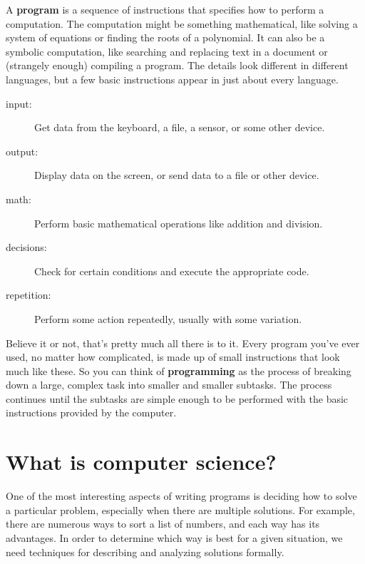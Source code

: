 \documentclass[12pt]{book}
\theoremstyle{exercise}
\begin{document}

A {\bf program} is a sequence of instructions that specifies how to perform a computation.
The computation might be something mathematical, like solving a system of equations or finding the roots of a polynomial.
It can also be a symbolic computation, like searching and replacing text in a document or (strangely enough) compiling a program.
The details look different in different languages, but a few basic instructions appear in just about every language.

\begin{description}
\item[input:] Get data from the keyboard, a file, a sensor, or some other device.
\item[output:] Display data on the screen, or send data to a file or other device.
\item[math:] Perform basic mathematical operations like addition and division.
\item[decisions:] Check for certain conditions and execute the appropriate code.
\item[repetition:] Perform some action repeatedly, usually with some variation.
\end{description}


Believe it or not, that's pretty much all there is to it.
Every program you've ever used, no matter how complicated, is made up of small instructions that look much like these.
So you can think of {\bf programming} as the process of breaking down a large, complex task into smaller and smaller subtasks.
The process continues until the subtasks are simple enough to be performed with the basic instructions provided by the computer.


\section{What is computer science?}

One of the most interesting aspects of writing programs is deciding how to solve a particular problem, especially when there are multiple solutions.
For example, there are numerous ways to sort a list of numbers, and each way has its advantages.
In order to determine which way is best for a given situation, we need techniques for describing and analyzing solutions formally.
\end{document}
